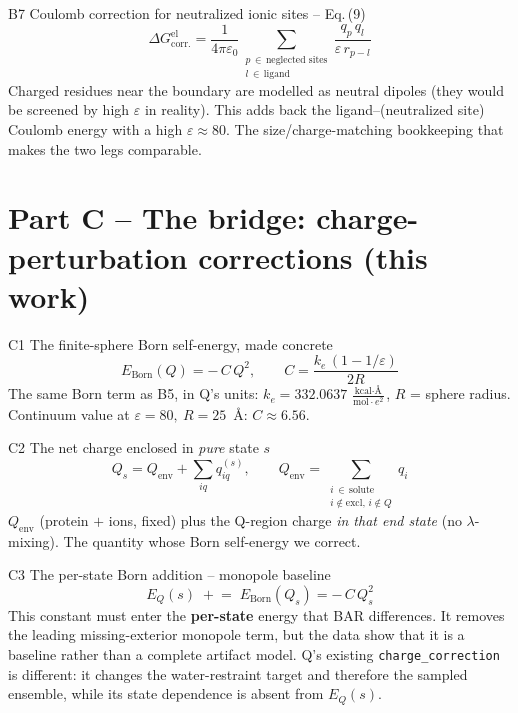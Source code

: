 \documentclass[11pt]{article}
\newcommand{\gap}{\vspace{10pt}}
\newcommand{\eq}[1]{{\large\[#1\]}}
\begin{document}
\begin{born}{B7 \;\textbullet\; Coulomb correction for neutralized ionic sites \;--\; Eq.\,(9)}
\eq{\Delta G_{\text{corr.}}^{\mathrm{el}}
   =\frac{1}{4\pi\varepsilon_0}\sum_{\substack{p\,\in\,\text{neglected sites}\\ l\,\in\,\text{ligand}}}
   \frac{q_p\,q_l}{\varepsilon\,r_{p-l}}}
\small Charged residues near the boundary are modelled as neutral dipoles (they would be screened by
high $\varepsilon$ in reality). This adds back the ligand--(neutralized site) Coulomb energy with a
high $\varepsilon\approx80$. The size/charge-matching bookkeeping that makes the two legs comparable.
\end{born}

\clearpage
\section*{Part C \;--\; The bridge: charge-perturbation corrections \textnormal{(this work)}}

\begin{bridge}{C1 \;\textbullet\; The finite-sphere Born self-energy, made concrete}
\eq{E_{\text{Born}}(Q)=-\,C\,Q^2,
   \qquad
   C=\frac{k_e\,(1-1/\varepsilon)}{2R}}
\small The same Born term as B5, in Q's units:
$k_e=332.0637\ \tfrac{\text{kcal}\cdot\text{\AA}}{\text{mol}\cdot e^2}$, $R$ = sphere radius.
Continuum value at $\varepsilon=80,\ R=25$~\AA: $C\approx6.56$.
\end{bridge}
\gap

\begin{bridge}{C2 \;\textbullet\; The net charge enclosed in \emph{pure} state $s$}
\eq{Q_s=Q_{\text{env}}+\sum_{iq}q_{iq}^{(s)},
   \qquad
   Q_{\text{env}}=\!\!\sum_{\substack{i\,\in\,\text{solute}\\ i\notin\text{excl},\,i\notin Q}}\!\! q_i}
\small $Q_{\text{env}}$ (protein $+$ ions, fixed) plus the Q-region charge \emph{in that end state}
(no $\lambda$-mixing). The quantity whose Born self-energy we correct.
\end{bridge}
\gap

\begin{bridge}{C3 \;\textbullet\; The per-state Born addition \;--\; monopole baseline}
\eq{E_Q(s)\;\mathrel{+}=\;E_{\text{Born}}(Q_s)=-\,C\,Q_s^2}
\small This constant must enter the \textbf{per-state} energy that BAR differences. It removes the
leading missing-exterior monopole term, but the data show that it is a baseline rather than a complete
artifact model. Q's existing \texttt{charge\_correction} is different: it changes the water-restraint
target and therefore the sampled ensemble, while its state dependence is absent from $E_Q(s)$.
\end{bridge}
\gap
\end{document}
